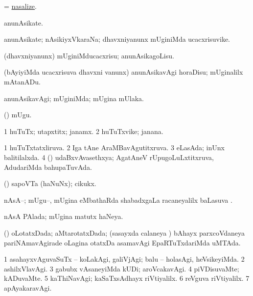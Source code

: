 \bentry
{}
\gl{\kirx}
\bmng
= \hyperlink{nasalize}{nasalize}. 
\emng
\eentry

\bentry
{}
\gl{\nA}
\bmng
anunAsikate. 
\emng
\eentry

\bentry
{}
\gl{\nA}
\bmng
anunAsikate; nAsikiyxVkaraNa; dhavxniyanunx mUginiMda ucacxrisuvike. 
\emng
\eentry

\bentry
{}
\gl{\sakirx}
\bmng
(dhavxniyanunx) mUginiMducacxrisu; anunAsikagoLisu. 
\emng

\noindent
\gl{\akirx}
\bmng
(bAyiyiMda ucacxrisuva dhavxni \mo vanunx) anunAsikavAgi horaDisu; mUginalilx mAtanADu. 
\emng
\eentry

\bentry
{}
\gl{\kirxvi}
\bmng
anunAsikavAgi; mUginiMda; mUgina mUlaka. 
\emng
\eentry

\bentry
{}
\gl{\nA}
\bmng
(\hA) mUgu. 
\emng
\eentry

\bentry
{}
\gl{\nA}
\bmng
\bnum
\num{1} huTuTx; utapxtitx; janamx. 
\num{2} huTuTxvike; janana. 
\enum
\emng
\eentry

\bentry
{}
\gl{\gu}
\bmng
\bnum
\num{1} huTuTxtatxliruva. 
\num{2} Iga tAne AraMBavAgutitxruva. 
\num{3} eLasAda; inUnx balitilalxda. 
\num{4} (\ravi) udaBxvAvasethxya; AgatAneV rUpugoLuLxtitxruva, AdudariMda bahupaTuvAda. 
\enum
\emng
\eentry

\bentry
{}
\gl{\nA}
\bmng
(\savi) sapoVTa (haNuNx); cikukx. 
\emng
\eentry

\bentry
{}
\gl{\sapUpa}
\bmng
nAsA--; mUgu--, mUgina eMbathaRda shabadxgaLa racaneyalilx baLasuva \sapUpa. 
\emng
\eentry

\bentry
{}
\gl{\gu}
\bmng
nAsA PAlada; mUgina matutx haNeya. 
\emng
\eentry

\bentry
{}
\gl{\gu}
\bmng
(\savi) oLotatxDada; aMtarotatxDada; (sasayxda calaneya \vi) bAhayx parxcoVdaneya pariNAmavAgirade oLagina otatxDa asamavAgi EpaRTuTxdariMda uMTAda. 
\emng
\eentry

\bentry
{}
\gl{\kirxvi}
\bmng
\bnum
\num{1} asahayxvAguvaSuTx -- koLakAgi, galiVjAgi; balu -- holasAgi, heVsikeyiMda. 
\num{2} ashilxVlavAgi. 
\num{3} gabubx vAsaneyiMda kUDi; aroVcakavAgi. 
\num{4} piVDisuvaMte; kADuvaMte. 
\num{5} kaThiNavAgi; kaSaTxsAdhayx riVtiyalilx. 
\num{6} reVguva riVtiyalilx. 
\num{7} apAyakaravAgi. 
\enum
\emng
\eentry

